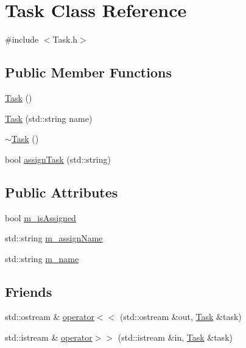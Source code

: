\hypertarget{class_task}{}\section{Task Class Reference}
\label{class_task}


{\ttfamily \#include $<$Task.\+h$>$}

\subsection*{Public Member Functions}
\begin{DoxyCompactItemize}
\item 
\mbox{\hyperlink{class_task_a0ca53354bdc006762a0fda68c64f7608}{Task}} ()
\item 
\mbox{\hyperlink{class_task_a26c2d4aaae7802df6c392ef1b4d38ab0}{Task}} (std\+::string name)
\item 
\mbox{\hyperlink{class_task_a3ecf499ea35fb4a96853969a1e1cbbce}{$\sim$\+Task}} ()
\item 
bool \mbox{\hyperlink{class_task_a9403859b7486d6fc373c230f5ddf442b}{assign\+Task}} (std\+::string)
\end{DoxyCompactItemize}
\subsection*{Public Attributes}
\begin{DoxyCompactItemize}
\item 
bool \mbox{\hyperlink{class_task_a171b8b24c985174d1a5ba64f4bc02b85}{m\+\_\+is\+Assigned}}
\item 
std\+::string \mbox{\hyperlink{class_task_abc9f42fa1d9fae58b195f88b7c4688bc}{m\+\_\+assign\+Name}}
\item 
std\+::string \mbox{\hyperlink{class_task_a0676177367cd081021726d78f070e083}{m\+\_\+name}}
\end{DoxyCompactItemize}
\subsection*{Friends}
\begin{DoxyCompactItemize}
\item 
std\+::ostream \& \mbox{\hyperlink{class_task_a3f7a3060e6047db0aa8323a32c1d8a51}{operator$<$$<$}} (std\+::ostream \&out, \mbox{\hyperlink{class_task}{Task}} \&task)
\item 
std\+::istream \& \mbox{\hyperlink{class_task_a2e885fe507a64c4f0a48041a5f857222}{operator$>$$>$}} (std\+::istream \&in, \mbox{\hyperlink{class_task}{Task}} \&task)
\end{DoxyCompactItemize}



